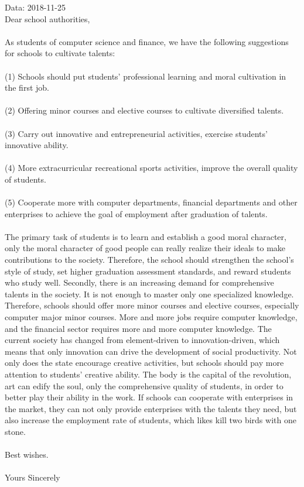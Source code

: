 \documentclass{mcmthesis}
\begin{document}
Data: 2018-11-25  \\

\noindent
Dear school authorities,\\
\\
As students of computer science and finance, we have the following suggestions for schools to cultivate talents:\\
\\
(1) Schools should put students' professional learning and moral cultivation in the first job.\\
\\
(2) Offering minor courses and elective courses to cultivate diversified talents.\\
\\
(3) Carry out innovative and entrepreneurial activities, exercise students' innovative ability. \\
\\
(4) More extracurricular recreational sports activities, improve the overall quality of students.  \\
\\
(5) Cooperate more with computer departments, financial departments and other enterprises to achieve the goal of employment after graduation of talents. \\
\\
The primary task of students is to learn and establish a good moral character, only the moral character of good people can really realize their ideals to make contributions to the society. Therefore, the school should strengthen the school's style of study, set higher graduation assessment standards, and reward students who study well. Secondly, there is an increasing demand for comprehensive talents in the society. It is not enough to master only one specialized knowledge. Therefore, schools should offer more minor courses and elective courses, especially computer major minor courses. More and more jobs require computer knowledge, and the financial sector requires more and more computer knowledge. The current society has changed from element-driven to innovation-driven, which means that only innovation can drive the development of social productivity. Not only does the state encourage creative activities, but schools should pay more attention to students' creative ability. The body is the capital of the revolution, art can edify the soul, only the comprehensive quality of students, in order to better play their ability in the work. If schools can cooperate with enterprises in the market, they can not only provide enterprises with the talents they need, but also increase the employment rate of students, which likes kill two birds with one stone. \\
\\
Best wishes.\\
\\
Yours Sincerely
\end{document}
